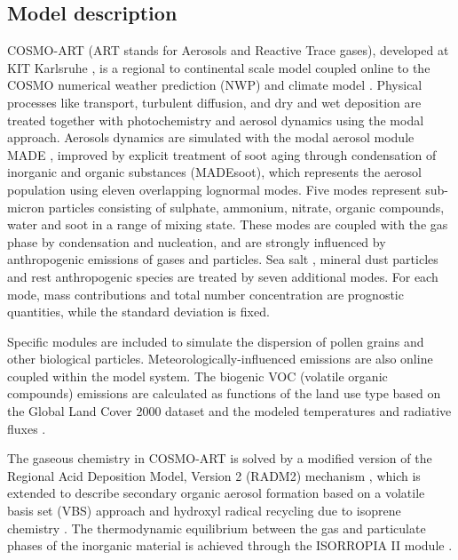 \subsection{Model description}
\label{subsec:1.1}
COSMO-ART  (ART  stands  for   Aerosols  and  Reactive  Trace  gases),
developed  at  KIT  Karlsruhe  \citep{Vogel-2009}, is  a  regional  to
continental scale model coupled  online to the COSMO numerical weather
prediction  (NWP) and  climate  model \citep{Baldauf-2011}.   Physical
processes  like  transport,  turbulent  diffusion,  and  dry  and  wet
deposition  are  treated  together  with  photochemistry  and  aerosol
dynamics using  the modal  approach.  Aerosols dynamics  are simulated
with the modal aerosol module MADE \citep{Ackermann-1998}, improved by
explicit  treatment of  soot aging  through condensation  of inorganic
\citep{Riemer-2003}   and   organic   substances   (MADEsoot),   which
represents the  aerosol population using  eleven overlapping lognormal
modes.   Five  modes  represent  sub-micron  particles  consisting  of
sulphate,  ammonium,  nitrate,   organic  compounds,  water  and  soot
\citep{Riemer-2004}  in a  range  of mixing  state.   These modes  are
coupled with  the gas  phase by condensation  and nucleation,  and are
strongly influenced by anthropogenic emissions of gases and particles.
Sea    salt     \citep{Lundgren-2013},    mineral    dust    particles
\citep{Vogel-2006, Stanelle-2010}  and rest anthropogenic  species are
treated by  seven additional modes. For each  mode, mass contributions
and total  number concentration  are prognostic quantities,  while the
standard deviation is fixed.

Specific  modules are included  to simulate  the dispersion  of pollen
grains    \citep{Vogel-2008}   and    other    biological   particles.
Meteorologically-influenced emissions  are also online  coupled within
the  model  system.  The  biogenic  VOC  (volatile organic  compounds)
emissions are  calculated as functions of  the land use  type based on
the Global  Land Cover 2000  dataset and the modeled  temperatures and
radiative fluxes \citep{Vogel-1995}.

The gaseous chemistry in COSMO-ART  is solved by a modified version of
the  Regional  Acid  Deposition  Model, Version  2  (RADM2)  mechanism
\citep{Stockwell-1990},  which  is   extended  to  describe  secondary
organic aerosol formation based on a volatile basis set (VBS) approach
\citep{Athanasopoulou-2013}  and  hydroxyl  radical recycling  due  to
isoprene chemistry \citep{Geiger-2003}.  The thermodynamic equilibrium
between the  gas and particulate  phases of the inorganic  material is
achieved through the  ISORROPIA II module \citep{Fountoukis-2007}. 

